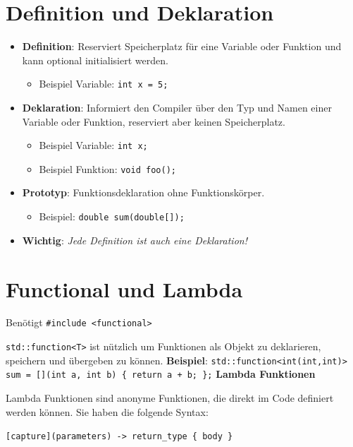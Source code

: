 \documentclass[10pt, a3paper, landscape]{article}
\newcommand{\algo}[1]{\textbf{\textcolor{blue!60!black}{#1}}}
\newcommand{\datastruct}[1]{\textbf{\textcolor{red!60!black}{#1}}}
\begin{document}
\begin{multicols*}{4}
\section{Definition und Deklaration}
\begin{itemize}
    \item \algo{Definition}: Reserviert Speicherplatz für eine Variable oder Funktion und kann optional initialisiert werden.
    \begin{itemize}
        \item Beispiel Variable: \lstinline|int x = 5;|
    \end{itemize}
    \item \datastruct{Deklaration}: Informiert den Compiler über den Typ und Namen einer Variable oder Funktion, reserviert aber keinen Speicherplatz.
    \begin{itemize}
        \item Beispiel Variable: \lstinline|int x;|
        \item Beispiel Funktion: \lstinline|void foo();|
    \end{itemize}
    \item \datastruct{Prototyp}: Funktionsdeklaration ohne Funktionskörper.
    \begin{itemize}
        \item Beispiel: \lstinline|double sum(double[]);|
    \end{itemize}
    \item \algo{Wichtig}: \textit{Jede Definition ist auch eine Deklaration!}
\end{itemize}

\section{Functional und Lambda}

Benötigt \lstinline|#include <functional>|

\lstinline|std::function<T>| ist nützlich um Funktionen als Objekt zu deklarieren, speichern und übergeben zu können. \algo{Beispiel}: \newline
\lstinline|std::function<int(int,int)> sum = [](int a, int b) { return a + b; };|
\newline
\newline
\datastruct{Lambda Funktionen}

Lambda Funktionen sind anonyme Funktionen, die direkt im Code definiert werden können. Sie haben die folgende Syntax:

\lstinline|[capture](parameters) -> return_type { body }|


\end{multicols*}
\end{document}
